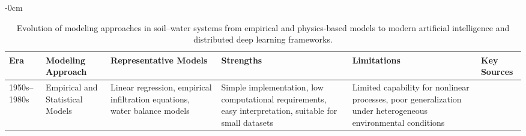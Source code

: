\documentclass[land,review,accept,pdftex,oneauthor]{Definitions/mdpi}
\begin{document}

\begin{table}[H] 

\caption{Evolution of modeling approaches in soil--water systems from empirical and physics-based models to modern artificial intelligence and distributed deep learning frameworks.\label{tab:evolution_models} }


\small
\renewcommand{\arraystretch}{1.2}

\begin{adjustwidth}{-\extralength}{0cm}
\begin{minipage}{\fulllength}
\begin{tabularx}{\textwidth}{m{2.2cm}<{\raggedright}m{2.6cm}<{\raggedright}m{3.3cm}<{\raggedright}m{3.4cm}<{\raggedright}m{3.3cm}<{\raggedright}m{1.2cm}<{\raggedright}}
\toprule
Era & Modeling Approach & Representative Models & Strengths & Limitations & Key Sources \\
\midrule






1950s--1980s &
Empirical and Statistical Models &
Linear regression, empirical infiltration equations, water balance models &
Simple implementation, low computational requirements, easy interpretation, suitable for small datasets &
Limited capability for nonlinear processes, poor generalization under heterogeneous environmental conditions &
\citep{Philip1957,Green1911,Thornthwaite1955} \\ 





\bottomrule
\end{tabularx}
\end{minipage}
\end{adjustwidth}
\end{table}
\end{document}
